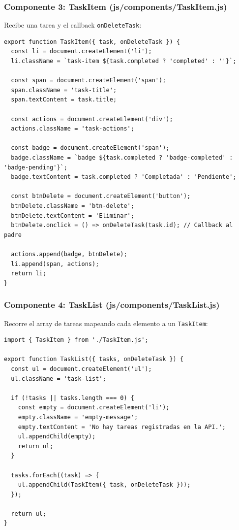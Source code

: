\documentclass[10pt,letterpaper]{article}
\begin{document}
\subsubsection{Componente 3: TaskItem (js/components/TaskItem.js)}
Recibe una tarea y el callback \texttt{onDeleteTask}:

\begin{lstlisting}[style=jsstyle]
export function TaskItem({ task, onDeleteTask }) {
  const li = document.createElement('li');
  li.className = `task-item ${task.completed ? 'completed' : ''}`;

  const span = document.createElement('span');
  span.className = 'task-title';
  span.textContent = task.title;

  const actions = document.createElement('div');
  actions.className = 'task-actions';

  const badge = document.createElement('span');
  badge.className = `badge ${task.completed ? 'badge-completed' : 'badge-pending'}`;
  badge.textContent = task.completed ? 'Completada' : 'Pendiente';

  const btnDelete = document.createElement('button');
  btnDelete.className = 'btn-delete';
  btnDelete.textContent = 'Eliminar';
  btnDelete.onclick = () => onDeleteTask(task.id); // Callback al padre

  actions.append(badge, btnDelete);
  li.append(span, actions);
  return li;
}
\end{lstlisting}

\subsubsection{Componente 4: TaskList (js/components/TaskList.js)}
Recorre el array de tareas mapeando cada elemento a un \texttt{TaskItem}:

\begin{lstlisting}[style=jsstyle]
import { TaskItem } from './TaskItem.js';

export function TaskList({ tasks, onDeleteTask }) {
  const ul = document.createElement('ul');
  ul.className = 'task-list';

  if (!tasks || tasks.length === 0) {
    const empty = document.createElement('li');
    empty.className = 'empty-message';
    empty.textContent = 'No hay tareas registradas en la API.';
    ul.appendChild(empty);
    return ul;
  }

  tasks.forEach((task) => {
    ul.appendChild(TaskItem({ task, onDeleteTask }));
  });

  return ul;
}
\end{lstlisting}
\end{document}
